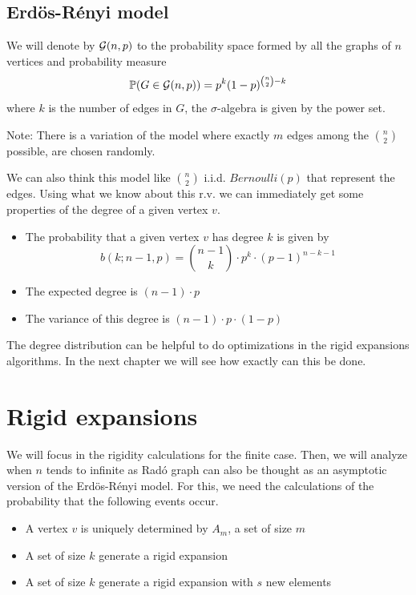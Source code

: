 \subsection{Erdös-Rényi model}
\begin{defini}
We will denote by $\mathcal{G}(n,p)$ to the probability space formed by all the graphs of $n$ vertices and probability measure 
$$ \mathbb{P}(G\in \mathcal{G}(n,p)) = p^{k} (1-p)^{\binom{n}{2}-k} $$
where $k$ is the number of edges in $G$, the $\sigma$-algebra is given by the power set.
\end{defini}

Note: There is a variation of the model where exactly $m$ edges among the $\binom{n}{2}$ possible, are chosen randomly.

We can also think this model like $\binom{n}{2}$ i.i.d. $Bernoulli(p)$ that represent the edges. Using what we know about this r.v. we can immediately get some properties of the degree of a given vertex $v$.

\begin{itemize}
\item The probability that a given vertex $v$ has degree $k$ is given by
$$b(k; n-1,p) = \binom{n-1}{k} \cdot p^{k} \cdot (p-1)^{n-k-1}$$
\item The expected degree is $(n-1)\cdot p$
\item The variance of this degree is $(n-1)\cdot p \cdot (1-p)$
\end{itemize}

The degree distribution can be helpful to do optimizations in the rigid expansions algorithms. In the next chapter we will see how exactly can this be done.

\section{Rigid expansions}

 We will focus in the rigidity calculations for the finite case. Then, we will analyze when $n$ tends to infinite as Radó graph can also be thought as an asymptotic version of the Erdös-Rényi model. For this, we need the calculations of the probability that the following events occur.

\begin{itemize}
\item A vertex $v$ is uniquely determined by $A_{m}$, a set of size $m$
\item A set of size $k$ generate a rigid expansion
\item A set of size $k$ generate a rigid expansion with $s$ new elements
\end{itemize}
\clearpage

